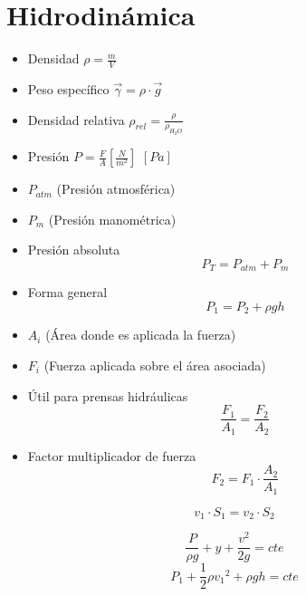 \section{Hidrodinámica}
\begin{itemize}
    \item Densidad $\rho=\frac{m}{V}$ 
    \item Peso específico $\Vec{\gamma} = \rho \cdot \Vec{g}$
    \item Densidad relativa $\rho_{rel}=\frac{\rho}{\rho_{H_2O}}$ 
    \item Presión $P = \frac{F}{A} \left[\frac{N}{m^2}\right]$ $[Pa]$
\end{itemize}

\begin{itemize}
    \item $P_{atm}$ (Presión atmosférica)
    \item $P_{m}$ (Presión manométrica)
    \item Presión absoluta
    \begin{equation}
        P_T = P_{atm} + P_m
    \end{equation}
    \item Forma general
    \begin{equation}
        P_1 = P_2 + \rho g h
    \end{equation}
\end{itemize}

\begin{itemize}
    \item $A_i$ (Área donde es aplicada la fuerza)
    \item $F_i$ (Fuerza aplicada sobre el área asociada)
    \item Útil para prensas hidráulicas
    \begin{equation}
        \frac{F_1}{A_1} = \frac{F_2}{A_2}
    \end{equation}
    \item Factor multiplicador de fuerza
    \begin{equation*}
        F_2 = F_1 \cdot \frac{A_2}{A_1}
    \end{equation*}
\end{itemize}

\begin{equation}
    v_1 \cdot S_1 = v_2 \cdot S_2
\end{equation}

\begin{equation}
    \frac{P}{\rho g} + y + \frac{v^2}{2g} = cte
\end{equation}
\begin{equation}
    P_1 + \frac{1}{2}\rho {v_1}^2 + \rho g h = cte
\end{equation}

\newpage
